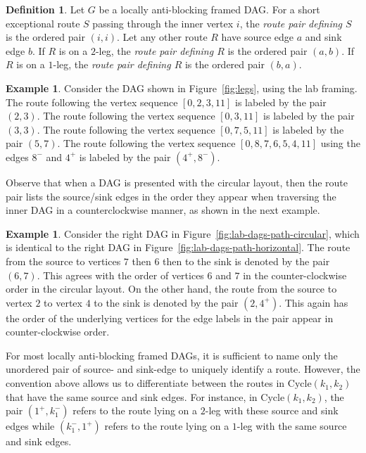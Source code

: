 \documentclass[12pt]{amsart}
\theoremstyle{definition}
\newtheorem{definition}[theorem]{Definition}
\newtheorem{example}[theorem]{Example}
\newcommand{\defn}[1]{\emph{\color{blue} #1}}
\newcommand\Cycle{\mathrm{Cycle}}
\begin{document}
\begin{definition}\label{def:routepairlabels}
Let $G$ be a locally anti-blocking framed DAG.
For a short exceptional route $S$ passing through the inner vertex $i$, the \defn{route pair defining $S$} is the ordered pair $(i,i)$.
Let any other route $R$ have source edge $a$ and sink edge $b$.
If $R$ is on a $2$-leg, the \defn{route pair defining $R$} is the ordered pair $(a,b)$. 
If $R$ is on a $1$-leg, the \defn{route pair defining $R$} is the ordered pair $(b,a)$.
\end{definition}

\begin{example}\label{ex:routepairlabels}
    Consider the DAG shown in Figure~\ref{fig:legs}, using the lab framing.
    The route following the vertex sequence $[0,2,3,11]$ is labeled by the pair $(2,3)$.
    The route following the vertex sequence $[0,3,11]$ is labeled by the pair $(3,3)$.
    The route following the vertex sequence $[0,7,5,11]$ is labeled by the pair $(5,7)$.
    The route following the vertex sequence $[0,8,7,6,5,4,11]$ using the edges $8^-$ and $4^+$ is labeled by the pair $(4^+,8^-)$.
\end{example}

Observe that when a DAG is presented with the circular layout, then the route pair lists the source/sink edges in the order they appear when traversing the inner DAG in a counterclockwise manner, as shown in the next example.

\begin{example}
    \label{ex:routepaircircular}
    Consider the right DAG in Figure~\ref{fig:lab-dags-path-circular}, which is identical to the right DAG in Figure~\ref{fig:lab-dags-path-horizontal}.
    The route from the source to vertices $7$ then $6$ then to the sink is denoted by the pair $(6,7)$.
    This agrees with the order of vertices $6$ and $7$ in the counter-clockwise order in the circular layout.
    On the other hand, the route from the source to vertex $2$ to vertex $4$ to the sink is denoted by the pair $(2,4^+)$.
    This again has the order of the underlying vertices for the edge labels in the pair appear in counter-clockwise order.
\end{example}

For most locally anti-blocking framed DAGs, it is sufficient to name only the unordered pair of source- and sink-edge to uniquely identify a route.
However, the convention above allows us to differentiate between the routes in $\Cycle(k_1,k_2)$ that have the same source and sink edges.
For instance, in $\Cycle(k_1,k_2)$, the pair $(1^+, k_1^-)$ refers to the route lying on a $2$-leg with these source and sink edges while $(k_1^-, 1^+)$ refers to the route lying on a $1$-leg with the same source and sink edges.
\end{document}
